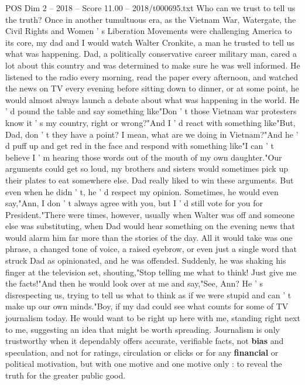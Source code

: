 \begin{textsample}{POS Dim 2 – 2018 – Score 11.00 – 2018/t000695.txt}  \label{ex:f2_pos_053}
Who can we trust to tell us the truth?
Once in another tumultuous era, as the Vietnam War, Watergate, the Civil Rights and Women ' s Liberation Movements were challenging America to its core, my dad and I would watch Walter Cronkite, a man he trusted to tell us what was happening.
Dad, a politically conservative career military man, cared a lot about this country and was determined to make sure he was well informed.
He listened to the radio every morning, read the paper every afternoon, and watched the news on TV every evening before sitting down to dinner, or at some point, he would almost always launch a debate about what was happening in the world.
He ' d pound the table and say something like"Don ' t those Vietnam war protesters know it ' s my country, right or wrong?"And I ' d react with something like"But, Dad, don ' t they have a point?
I mean, what are we doing in Vietnam?"And he ' d puff up and get red in the face and respond with something like"I can ' t believe I ' m hearing those words out of the mouth of my own daughter."Our arguments could get so loud, my brothers and sisters would sometimes pick up their plates to eat somewhere else.
Dad really liked to win these arguments.
But even when he didn ' t, he ' d respect my opinion.
Sometimes, he would even say,"Ann, I don ' t always agree with you, but I ' d still vote for you for President."There were times, however, usually when Walter was off and someone else was substituting, when Dad would hear something on the evening news that would alarm him far more than the stories of the day.
All it would take was one phrase, a changed tone of voice, a raised eyebrow, or even just a single word that struck Dad as opinionated, and he was offended.
Suddenly, he was shaking his finger at the television set, shouting,"Stop telling me what to think!
Just give me the facts!"And then he would look over at me and say,"See, Ann?
He ' s disrespecting us, trying to tell us what to think as if we were stupid and can ' t make up our own minds."Boy, if my dad could see what counts for some of TV journalism today.
He would want to be right up here with me, standing right next to me, suggesting an idea that might be worth spreading.
Journalism is only trustworthy when it dependably offers accurate, verifiable facts, not \textbf{bias} and speculation, and not for ratings, circulation or clicks or for any \textbf{financial} or political motivation, but with one motive and one motive only : to reveal the truth for the greater public good.

\end{textsample}
